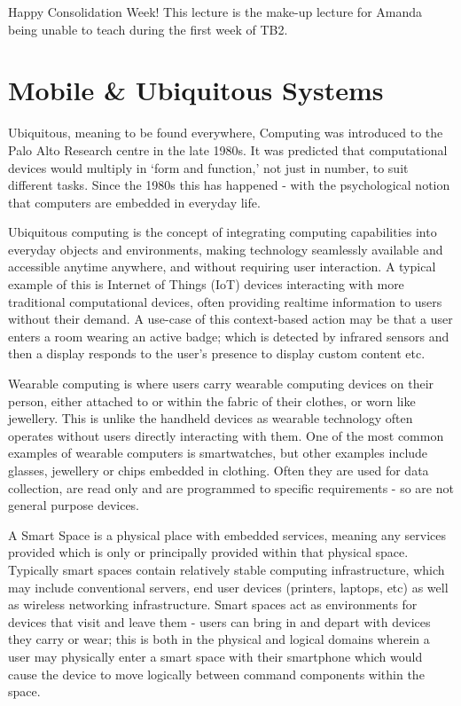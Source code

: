 
Happy Consolidation Week! This lecture is the make-up lecture for Amanda being unable to teach during the first week of TB2. 

\section{Mobile \& Ubiquitous Systems}
Ubiquitous, meaning to be found everywhere, Computing was introduced to the Palo Alto Research centre in the late 1980s. It was predicted that computational devices would multiply in `form and function,' not just in number, to suit different tasks. Since the 1980s this has happened - with the psychological notion that computers are embedded in everyday life. 

Ubiquitous computing is the concept of integrating computing capabilities into everyday objects and environments, making technology seamlessly available and accessible anytime anywhere, and without requiring user interaction. A typical example of this is Internet of Things (IoT) devices interacting with more traditional computational devices, often providing realtime information to users without their demand. A use-case of this context-based action may be that a user enters a room wearing an active badge; which is detected by infrared sensors and then a display responds to the user's presence to display custom content etc. 

Wearable computing is where users carry wearable computing devices on their person, either attached to or within the fabric of their clothes, or worn like jewellery. This is unlike the handheld devices as wearable technology often operates without users directly interacting with them. One of the most common examples of wearable computers is smartwatches, but other examples include glasses, jewellery or chips embedded in clothing. Often they are used for data collection, are read only and are programmed to specific requirements - so are not general purpose devices. 

A Smart Space is a physical place with embedded services, meaning any services provided which is only or principally provided within that physical space. Typically smart spaces contain relatively stable computing infrastructure, which may include conventional servers, end user devices (printers, laptops, etc) as well as wireless networking infrastructure. Smart spaces act as environments for devices that visit and leave them - users can bring in and depart with devices they carry or wear; this is both in the physical and logical domains wherein a user may physically enter a smart space with their smartphone which would cause the device to move logically between command components within the space. 

